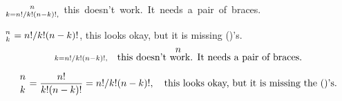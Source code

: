 $n \atop k = n! / k!(n-k)!,$
\hbox{this doesn't work. It needs a pair of braces.}\par{}\baselineskip
${n \atop k} = n! / k!(n-k)!$, this looks okay, but it is missing ()'s.
$$n \atop k = n! / k!(n-k)!,\quad
\hbox{this doesn't work. It needs a pair of braces.}$$\par
$${n \atop k} = {n! \over k!(n-k)!} = n! / k!(n-k)!,\quad
\hbox{this looks okay, but it is missing the ()'s.}$$
\bye
